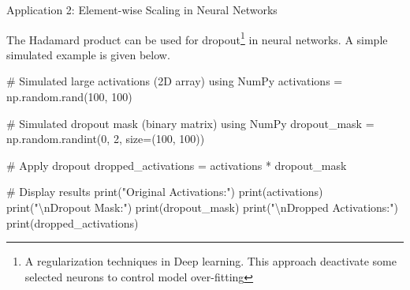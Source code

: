\documentclass[
  letterpaper,
  DIV=11,
  numbers=noendperiod]{scrreprt}
\newenvironment{Shaded}{\begin{snugshade}}{\end{snugshade}}
\newcommand{\BuiltInTok}[1]{\textcolor[rgb]{0.00,0.23,0.31}{#1}}
\newcommand{\CharTok}[1]{\textcolor[rgb]{0.13,0.47,0.30}{#1}}
\newcommand{\CommentTok}[1]{\textcolor[rgb]{0.37,0.37,0.37}{#1}}
\newcommand{\DecValTok}[1]{\textcolor[rgb]{0.68,0.00,0.00}{#1}}
\newcommand{\NormalTok}[1]{\textcolor[rgb]{0.00,0.23,0.31}{#1}}
\newcommand{\OperatorTok}[1]{\textcolor[rgb]{0.37,0.37,0.37}{#1}}
\newcommand{\StringTok}[1]{\textcolor[rgb]{0.13,0.47,0.30}{#1}}
\theoremstyle{plain}
\theoremstyle{definition}
\theoremstyle{remark}
\begin{document}
Application 2: Element-wise Scaling in Neural Networks

The Hadamard product can be used for dropout\footnote{A regularization
  techniques in Deep learning. This approach deactivate some selected
  neurons to control model over-fitting} in neural networks. A simple
simulated example is given below.

\begin{Shaded}
\begin{Highlighting}[]
\CommentTok{\# Simulated large activations (2D array) using NumPy}
\NormalTok{activations }\OperatorTok{=}\NormalTok{ np.random.rand(}\DecValTok{100}\NormalTok{, }\DecValTok{100}\NormalTok{)}

\CommentTok{\# Simulated dropout mask (binary matrix) using NumPy}
\NormalTok{dropout\_mask }\OperatorTok{=}\NormalTok{ np.random.randint(}\DecValTok{0}\NormalTok{, }\DecValTok{2}\NormalTok{, size}\OperatorTok{=}\NormalTok{(}\DecValTok{100}\NormalTok{, }\DecValTok{100}\NormalTok{))}

\CommentTok{\# Apply dropout}
\NormalTok{dropped\_activations }\OperatorTok{=}\NormalTok{ activations }\OperatorTok{*}\NormalTok{ dropout\_mask}

\CommentTok{\# Display results}
\BuiltInTok{print}\NormalTok{(}\StringTok{"Original Activations:"}\NormalTok{)}
\BuiltInTok{print}\NormalTok{(activations)}
\BuiltInTok{print}\NormalTok{(}\StringTok{"}\CharTok{\textbackslash{}n}\StringTok{Dropout Mask:"}\NormalTok{)}
\BuiltInTok{print}\NormalTok{(dropout\_mask)}
\BuiltInTok{print}\NormalTok{(}\StringTok{"}\CharTok{\textbackslash{}n}\StringTok{Dropped Activations:"}\NormalTok{)}
\BuiltInTok{print}\NormalTok{(dropped\_activations)}
\end{Highlighting}
\end{Shaded}
\end{document}
